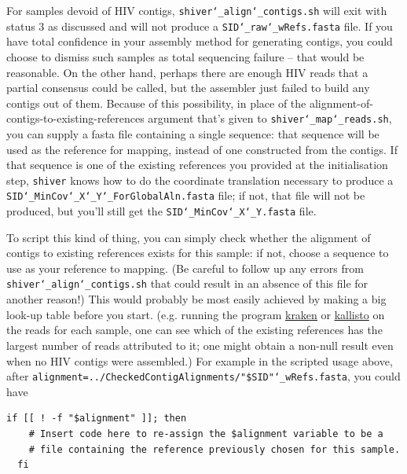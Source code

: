 \documentclass{article}
\newcommand{\shiv}{\c{shiver}\xspace}
\newcommand{\sac}{\c{shiver\char`_align\char`_contigs.sh}\xspace}
\newcommand{\smr}{\c{shiver\char`_map\char`_reads.sh}\xspace}
\let\c\texttt
\newcommand{\www}{\color{blue} \underline}
\begin{document}
For samples devoid of HIV contigs, \sac will exit with status 3 as discussed and will not produce a \c{SID\char`_raw\char`_wRefs.fasta} file.
If you have total confidence in your assembly method for generating contigs, you could choose to dismiss such samples as total sequencing failure -- that would be reasonable.
On the other hand, perhaps there are enough HIV reads that a partial consensus could be called, but the assembler just failed to build any contigs out of them.
Because of this possibility, in place of the alignment-of-contigs-to-existing-references argument that's given to \smr, you can supply a fasta file containing a single sequence: that sequence will be used as the reference for mapping, instead of one constructed from the contigs.
If that sequence is one of the existing references you provided at the initialisation step, \shiv knows how to do the coordinate translation necessary to produce a \c{SID\char`_MinCov\char`_X\char`_Y\char`_ForGlobalAln.fasta} file; if not, that file will not be produced, but you'll still get the \c{SID\char`_MinCov\char`_X\char`_Y.fasta} file.

To script this kind of thing, you can simply check whether the alignment of contigs to existing references exists for this sample: if not, choose a sequence to use as your reference to mapping.
(Be careful to follow up any errors from \sac that could result in an absence of this file for another reason!)
This would probably be most easily achieved by making a big look-up table before you start.
(e.g. running the program \href{https://ccb.jhu.edu/software/kraken/}{\www{kraken}} or \href{https://pachterlab.github.io/kallisto/}{\www{kallisto}} on the reads for each sample, one can see which of the existing references has the largest number of reads attributed to it; one might obtain a non-null result even when no HIV contigs were assembled.)
For example in the scripted usage above, after \c{alignment=../CheckedContigAlignments/"\$SID"\char`_wRefs.fasta}, you could have
\begin{Verbatim}[samepage=true]
  if [[ ! -f "$alignment" ]]; then
    # Insert code here to re-assign the $alignment variable to be a
    # file containing the reference previously chosen for this sample.
  fi
\end{Verbatim}
\end{document}
